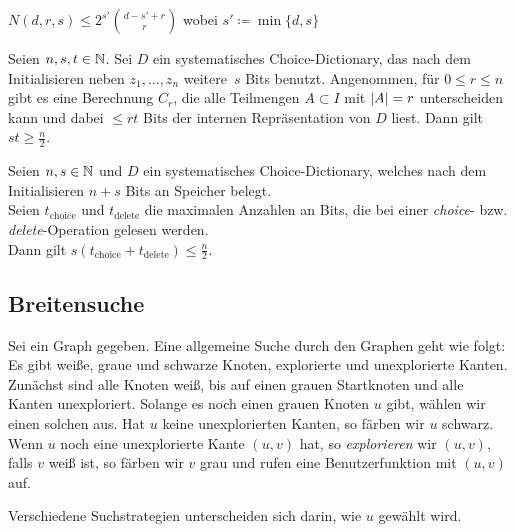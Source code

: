 \documentclass{cheat-sheet}
\begin{document}
\begin{lem}
  $N(d, r, s) \leq 2^{s'} \binom{d - s' + r}{r}$ \enspace
  wobei $s' \coloneqq \min \{ d, s \}$
\end{lem}

\begin{thm}
  Seien $n, s, t \in \mathbb{N}$.
  Sei $D$ ein systematisches Choice-Dictionary, das nach dem Initialisieren neben $z_1, \ldots, z_n$ weitere~$s$ Bits benutzt.
  Angenommen, für $0 \leq r \leq n$ gibt es eine Berechnung $C_r$, die alle Teilmengen $A \subset I$ mit $\lvert A\rvert = r$ unterscheiden kann und dabei $\leq rt$ Bits der internen Repräsentation von $D$ liest.
  Dann gilt $st \geq \tfrac{n}{2}$.
\end{thm}

\begin{kor}
  Seien $n, s \in \mathbb{N}$ und $D$ ein systematisches Choice-Dictionary, welches nach dem Initialisieren $n + s$ Bits an Speicher belegt. \\
  Seien $t_{\text{choice}}$ und $t_{\text{delete}}$ die maximalen Anzahlen an Bits, die bei einer \textit{choice}- bzw. \textit{delete}-Operation gelesen werden. \\
  Dann gilt $s (t_{\text{choice}} + t_{\text{delete}}) \leq \tfrac{n}{2}$.
\end{kor}


\subsection{Breitensuche}

\begin{defn}
  Sei ein Graph gegeben.
  Eine allgemeine Suche durch den Graphen geht wie folgt:
  Es gibt weiße, graue und schwarze Knoten, explorierte und unexplorierte Kanten.
  Zunächst sind alle Knoten weiß, bis auf einen grauen Startknoten und alle Kanten unexploriert.
  Solange es noch einen grauen Knoten $u$ gibt, wählen wir einen solchen aus.
  Hat $u$ keine unexplorierten Kanten, so färben wir $u$ schwarz.
  Wenn $u$ noch eine unexplorierte Kante $(u, v)$ hat, so \textit{explorieren} wir $(u, v)$, \dh{} falls $v$ weiß ist, so färben wir $v$ grau und rufen eine Benutzerfunktion mit $(u, v)$ auf.
\end{defn}

\begin{bem}
  Verschiedene Suchstrategien unterscheiden sich darin, wie $u$ gewählt wird.
\end{bem}
\end{document}

